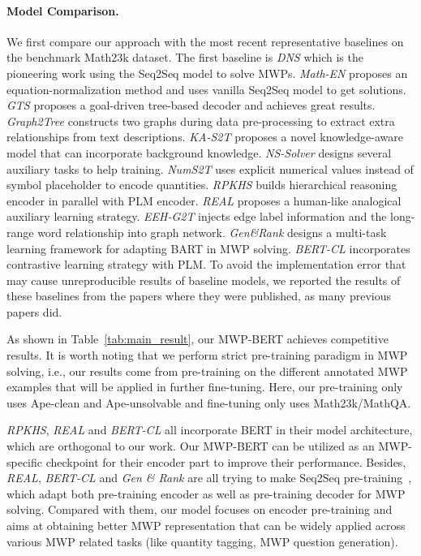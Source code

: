 \documentclass[11pt]{article}
\begin{document}
\paragraph{Model Comparison.}
We first compare our approach with the most recent representative baselines on the benchmark Math23k dataset. The first baseline is \textsl{DNS} which is the pioneering work using the Seq2Seq model to solve MWPs. \textsl{Math-EN} \cite{wang2018translating} proposes an equation-normalization method and uses vanilla Seq2Seq model to get solutions. \textsl{GTS} \cite{xie2019goal} proposes a goal-driven tree-based decoder and achieves great results. \textsl{Graph2Tree} \cite{zhang2020graph} constructs two graphs during data pre-processing to extract extra relationships from text descriptions. \textsl{KA-S2T} \cite{wu2020knowledge} proposes a novel knowledge-aware model that can incorporate background knowledge. 
\textsl{NS-Solver} \cite{qin2021neural} designs several auxiliary tasks to help training. \textsl{NumS2T} \cite{wu2021math} uses explicit numerical values instead of symbol placeholder to encode quantities. \textsl{RPKHS} \cite{yu2021improving} builds hierarchical reasoning encoder in parallel with PLM encoder. \textsl{REAL} \cite{huang2021recall} proposes a human-like analogical auxiliary learning strategy. \textsl{EEH-G2T} \cite{wu2021edge} 
injects edge label information and the long-range word relationship into graph network. \textsl{Gen\&Rank} \cite{DBLP:conf/emnlp/ShenYLSJ0021} designs a multi-task learning framework for adapting BART in MWP solving. \textsl{BERT-CL} \cite{li2021seeking} 
incorporates contrastive learning strategy with PLM. To avoid the implementation error that may cause unreproducible results of baseline models, we reported the results of these baselines from the papers where they were published, as many previous papers \cite{zhang2020graph,shen2020solving} did. 

As shown in Table~\ref{tab:main_result}, our MWP-BERT achieves competitive results. It is worth noting that we perform strict pre-training paradigm in MWP solving, i.e., our results come from pre-training on the different annotated MWP examples that will be applied in further fine-tuning. Here, our pre-training only uses Ape-clean and Ape-unsolvable and fine-tuning only uses Math23k/MathQA.

\textsl{RPKHS}, \textsl{REAL} and \textsl{BERT-CL} all incorporate BERT in their model architecture, which are orthogonal to our work. Our MWP-BERT can be utilized as an MWP-specific checkpoint for their encoder part to improve their performance. Besides, \textsl{REAL}, \textsl{BERT-CL} and \textsl{Gen \& Rank} are all trying to make Seq2Seq pre-training~\cite{DBLP:conf/acl/LewisLGGMLSZ20}, which adapt both pre-training encoder as well as pre-training decoder for MWP solving. Compared with them, our model focuses on encoder pre-training and aims at obtaining better MWP representation that can be widely applied across various MWP related tasks (like quantity tagging, MWP question generation). 
\end{document}
